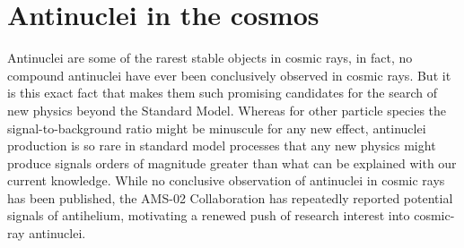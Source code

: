 \section{Antinuclei in the cosmos}\label{sec:AntinucleiInTheCosmos}
Antinuclei are some of the rarest stable objects in cosmic rays, in fact, no compound antinuclei have ever been conclusively observed in cosmic rays. But it is this exact fact that makes them such promising candidates for the search of new physics beyond the Standard Model. Whereas for other particle species the signal-to-background ratio might be minuscule for any new effect, antinuclei production is so rare in standard model processes that any new physics might produce signals orders of magnitude greater than what can be explained with our current knowledge. While no conclusive observation of antinuclei in cosmic rays has been published, the AMS-02 Collaboration has repeatedly reported potential signals of antihelium\cite{}, motivating a renewed push of research interest into cosmic-ray antinuclei. \\

